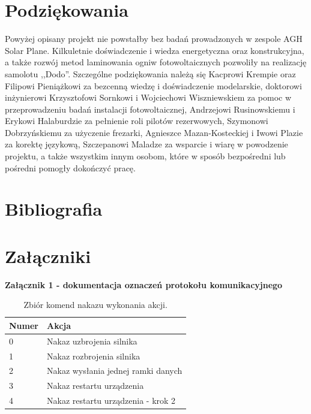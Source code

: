\documentclass[12pt, a4paper]{article}
\begin{document}
\clearpage
\section*{Podziękowania}
Powyżej opisany projekt nie powstałby bez badań prowadzonych w zespole AGH Solar Plane. Kilkuletnie doświadczenie i wiedza energetyczna oraz konstrukcyjna, a także rozwój metod laminowania ogniw fotowoltaicznych pozwoliły na realizację samolotu ,,Dodo''. Szczególne podziękowania należą się Kacprowi Krempie oraz Filipowi Pieniążkowi za bezcenną wiedzę i doświadczenie modelarskie, doktorowi inżynierowi Krzysztofowi Sornkowi i Wojciechowi Wiszniewskiem za pomoc w przeprowadzeniu badań instalacji fotowoltaicznej, Andrzejowi Rusinowskiemu i Erykowi Halaburdzie za pełnienie roli pilotów rezerwowych, Szymonowi Dobrzyńskiemu za użyczenie frezarki, Agnieszce Mazan-Kosteckiej i Iwowi Plazie za korektę językową, Szczepanowi Maladze za wsparcie i wiarę w powodzenie projektu, a także wszystkim innym osobom, które w sposób bezpośredni lub pośredni pomogły dokończyć pracę.

\clearpage

\section{Bibliografia}

\renewcommand{\refname}{}


\clearpage

\section{Załączniki}
\begin{center}
\textbf{Załącznik 1 - dokumentacja oznaczeń protokołu komunikacyjnego}
\end{center}

\begin{table}[H]
\centering
\begin{tabular}{| l | l |}
\hline
\textbf{Numer} & \textbf{Akcja} \\
\hline
0 & Nakaz uzbrojenia silnika \\
\hline
1 & Nakaz rozbrojenia silnika \\
\hline
2 & Nakaz wysłania jednej ramki danych \\
\hline
3 & Nakaz restartu urządzenia \\
\hline
4 & Nakaz restartu urządzenia - krok 2 \\
\hline

\end{tabular}
\caption{Zbiór komend nakazu wykonania akcji.}
\end{table}
\end{document}
